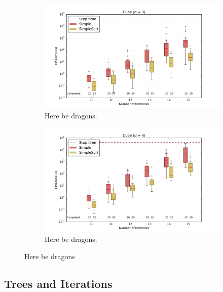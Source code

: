 \begin{figure}[htbp]
  \centering
  \begin{subfigure}[t]{0.5\textwidth}
    \includegraphics[width=\textwidth]{gfx/boxplots/plot_nvst_boxplot_d3_Cube_3}
  \caption{Here be dragons.\label{fig:boxplot-d3-cube-3}}
  \end{subfigure}%
  \begin{subfigure}[t]{0.5\textwidth}
    \includegraphics[width=\textwidth]{gfx/boxplots/plot_nvst_boxplot_d4_Cube_3}
  \caption{Here be dragons.\label{fig:boxplot-d3-cube-3}}
  \end{subfigure}%
  \caption[Here be dragons]{Here be dragons\label{fig:boxplot-cube-3}}
\end{figure}

\subsection{Trees and Iterations}
\label{sec:trees-iterations}

